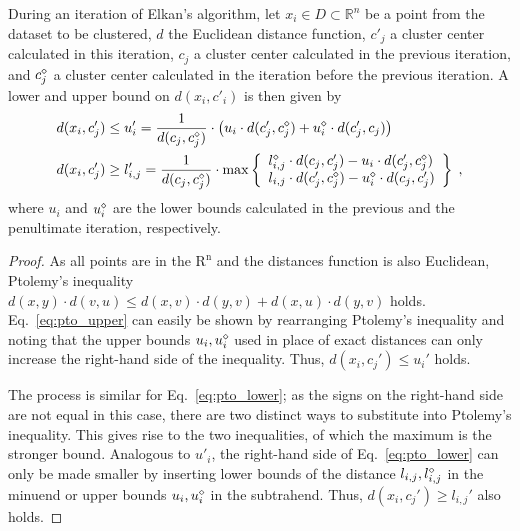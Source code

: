 \begin{theorem}
	During an iteration of Elkan's algorithm,
	let $x_i \in D \subset \mathbb{R}^n$ be a point from the dataset to be clustered,
	$d$ the Euclidean distance function,
	$c'_j$ a cluster center calculated in this iteration,
	$c_j$ a cluster center calculated in the previous iteration, and
	$c^\diamond_j$ a cluster center calculated in the iteration before the previous iteration.
	A lower and upper bound on $d(x_i,c'_i)$ is then given by
	\begin{align}
		\label{eq:pto_upper}
		d(x_i, c_j') & \leq u_i' = \frac{1}{d(c_j, c_j^{\diamond})} \cdot \left( u_i \cdot d(c_j', c_j^{\diamond}) + u_i^{\diamond} \cdot d(c_j', c_j) \right) \\
		\label{eq:pto_lower}
		d(x_i, c_j') & \geq l_{i,j}' = \frac{1}{d(c_j, c_j^{\diamond})} \cdot \max \left\{
		\begin{array}{l}
			l_{i,j}^{\diamond} \cdot d(c_j, c_j') - u_i \cdot d(c_j', c_j^{\diamond}) \\
			l_{i,j} \cdot d(c_j', c_j^{\diamond}) - u_i^{\diamond} \cdot d(c_j, c_j')
		\end{array}
		\right\}\;,
	\end{align}
	where $u_i$ and $u^\diamond_i$ are the lower bounds calculated in the previous and the penultimate iteration, respectively.
\end{theorem}
\begin{proof}
	As all points are in the $\mathrm{R^n}$ and the distances function is also Euclidean, Ptolemy's inequality
	$d(x, y)\cdot d(v, u) \leq d(x, v) \cdot d(y,v) + d(x, u) \cdot d(y, v)$ holds.
	Eq.~\ref{eq:pto_upper} can easily be shown by rearranging Ptolemy's inequality and
	noting that the upper bounds $u_i, u^\diamond_i$ used in place of exact distances can only increase the right-hand side of the inequality. Thus, $d(x_i, c_j') \leq u_i'$ holds.

	The process is similar for Eq.~\ref{eq:pto_lower}; as the signs on the right-hand side are not equal in this case, there are two distinct ways to substitute into Ptolemy's inequality.
	This gives rise to the two inequalities, of which the maximum is the stronger bound.
	Analogous to $u'_i$, the right-hand side of Eq.~\ref{eq:pto_lower} can only be made smaller by inserting lower bounds of the distance $l_{i,j},l_{i,j}^\diamond$ in the minuend or upper bounds $u_i, u^\diamond_i$ in the subtrahend.
	Thus, $d(x_i, c_j') \geq l_{i,j}'$ also holds.
\end{proof}




